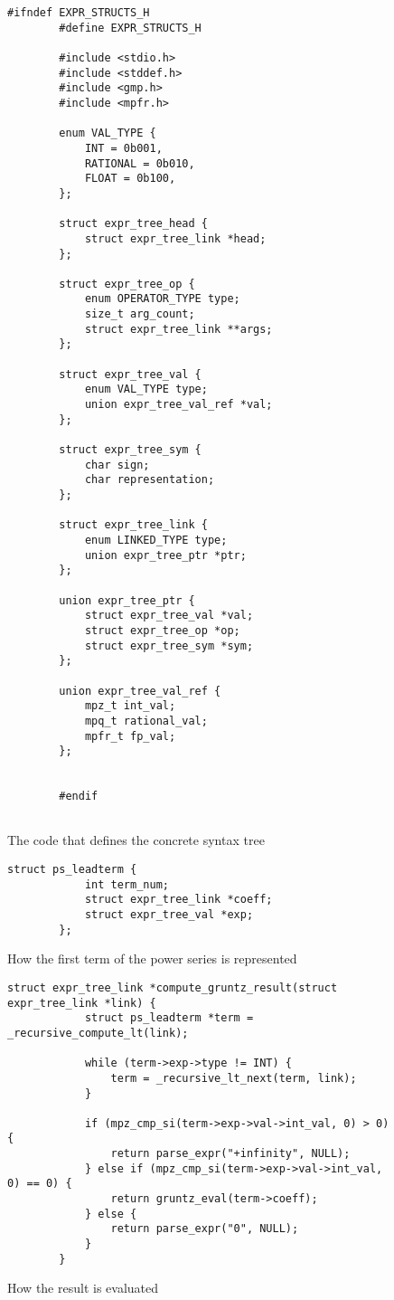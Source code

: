 \begin{figure}
	\centering
	\begin{lstlisting}[style=CStyle]
		#ifndef EXPR_STRUCTS_H
		#define EXPR_STRUCTS_H
		
		#include <stdio.h>
		#include <stddef.h>
		#include <gmp.h>
		#include <mpfr.h>
		
		enum VAL_TYPE {
			INT = 0b001,
			RATIONAL = 0b010,
			FLOAT = 0b100,
		};
		
		struct expr_tree_head {
			struct expr_tree_link *head;
		};
		
		struct expr_tree_op {
			enum OPERATOR_TYPE type;
			size_t arg_count;
			struct expr_tree_link **args;
		};
		
		struct expr_tree_val {
			enum VAL_TYPE type;
			union expr_tree_val_ref *val;
		};
		
		struct expr_tree_sym {
			char sign;
			char representation;
		};
		
		struct expr_tree_link {
			enum LINKED_TYPE type;
			union expr_tree_ptr *ptr;
		};
		
		union expr_tree_ptr {
			struct expr_tree_val *val;
			struct expr_tree_op *op;
			struct expr_tree_sym *sym;
		};
		
		union expr_tree_val_ref {
			mpz_t int_val;
			mpq_t rational_val;
			mpfr_t fp_val;
		};
		
		
		#endif
		
	\end{lstlisting}
	\caption{The code that defines the concrete syntax tree} \label{code:expr_structs}
\end{figure}

\begin{figure}
	\centering
	\begin{lstlisting}[style=CStyle]
		struct ps_leadterm {
			int term_num;
			struct expr_tree_link *coeff;
			struct expr_tree_val *exp;
		};
	\end{lstlisting}
	\caption{How the first term of the power series is represented} \label{code:ps_structs}
\end{figure}

\begin{figure}
	\centering
	\begin{lstlisting}[style=CStyle]
		struct expr_tree_link *compute_gruntz_result(struct expr_tree_link *link) {
			struct ps_leadterm *term = _recursive_compute_lt(link);
			
			while (term->exp->type != INT) {
				term = _recursive_lt_next(term, link);
			}
		
			if (mpz_cmp_si(term->exp->val->int_val, 0) > 0) {
				return parse_expr("+infinity", NULL);
			} else if (mpz_cmp_si(term->exp->val->int_val, 0) == 0) {
				return gruntz_eval(term->coeff);
			} else {
				return parse_expr("0", NULL);
			}
		}
	\end{lstlisting}
	\caption{How the result is evaluated} \label{code:ps_result}
\end{figure}

